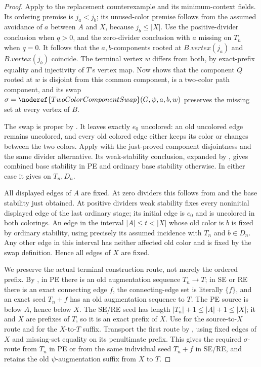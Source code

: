 \begin{proof}
Apply  to the replacement counterexample and its
minimum-context fields. Its ordering premise is \(j_a<j_b\);
its unused-color premise follows from the assumed avoidance of \(a\)
between \(A\) and \(X\), because \(j_b\leq |X|\).
Use the positive-divider conclusion when \(q>0\), and the zero-divider
conclusion with \(a\) missing on \(T_n\) when \(q=0\).
It follows that the \(a,b\)-components rooted at \(B.vertex(j_a)\)
and \(B.vertex(j_b)\) coincide. The terminal vertex \(w\) differs from
both, by exact-prefix equality and injectivity of \(T\)'s vertex map.
Now  shows that the
component \(Q\) rooted at \(w\) is disjoint from this common component,
is a two-color path component, and its swap
\(\sigma=\noderef{TwoColorComponentSwap}(G,\psi,a,b,w)\) preserves the
missing set at every vertex of \(B\).

The swap is proper by .
It leaves exactly \(e_0\) uncolored: an old uncolored edge remains
uncolored, and every old colored edge either keeps its color or changes
between the two colors. Apply  with
the just-proved component disjointness and the same divider alternative.
Its weak-stability conclusion, expanded by ,
gives combined base stability in PE and ordinary base stability otherwise.
In either case it gives  on \(T_n,D_n\).

All displayed edges of \(A\) are fixed. At zero dividers this follows
from  and the base stability just
obtained. At positive dividers weak stability fixes every noninitial
displayed edge of the last ordinary stage; its initial edge is \(e_0\)
and is uncolored in both colorings. An edge in the interval
\(|A|\leq t<|X|\) whose old color is \(b\) is fixed by ordinary stability,
using precisely its assumed incidence with \(T_n\) and \(b\in D_n\).
Any other edge in this interval has neither affected old color and is
fixed by the swap definition. Hence all edges of \(X\) are fixed.

We preserve the actual terminal construction route, not merely the
ordered prefix. By , in PE there is
an old augmentation sequence \(T_n\to T\); in SE or RE there is an exact
connecting edge \(f\), the connecting-edge set is literally \(\{f\}\),
and an exact seed \(T_n+f\) has an old augmentation sequence to \(T\).
The PE source is below \(A\), hence below \(X\).
The SE/RE seed has length \(|T_n|+1\leq |A|+1\leq |X|\);
it and \(X\) are prefixes of \(T\), so it is an exact prefix of \(X\).
Use  for the source-to-\(X\)
route and  for the
\(X\)-to-\(T\) suffix. Transport the first route by
, using fixed
edges of \(X\) and missing-set equality on its penultimate prefix.
This gives the required \(\sigma\)-route from \(T_n\) in PE or from
the same individual seed \(T_n+f\) in SE/RE, and retains the old
\(\psi\)-augmentation suffix from \(X\) to \(T\).


\end{proof}
